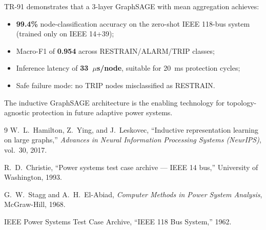\documentclass[11pt,a4paper]{article}
\begin{document}
TR-91 demonstrates that a 3-layer GraphSAGE with mean aggregation achieves:
\begin{itemize}
  \item \textbf{99.4\%} node-classification accuracy on the zero-shot
        IEEE 118-bus system (trained only on IEEE 14+39);
  \item Macro-F1 of \textbf{0.954} across RESTRAIN/ALARM/TRIP classes;
  \item Inference latency of \textbf{33~$\mu$s/node}, suitable for
        20~ms protection cycles;
  \item Safe failure mode: no TRIP nodes misclassified as RESTRAIN.
\end{itemize}

The inductive GraphSAGE architecture is the enabling technology for
topology-agnostic protection in future adaptive power systems.

\begin{thebibliography}{9}
  W.~L.\ Hamilton, Z.~Ying, and J.~Leskovec,
  ``Inductive representation learning on large graphs,''
  \emph{Advances in Neural Information Processing Systems (NeurIPS)},
  vol.~30, 2017.

  R.~D.\ Christie,
  ``Power systems test case archive --- IEEE 14 bus,''
  University of Washington, 1993.

  G.~W.\ Stagg and A.~H.\ El-Abiad,
  \emph{Computer Methods in Power System Analysis},
  McGraw-Hill, 1968.

  IEEE Power Systems Test Case Archive,
  ``IEEE 118 Bus System,'' 1962.
\end{thebibliography}
\end{document}
